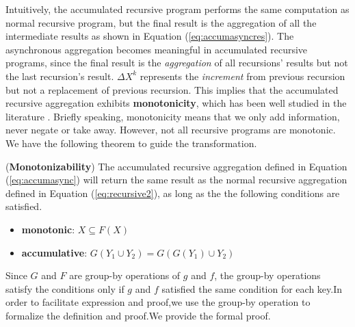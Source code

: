 {\color{green}
Intuitively, the accumulated recursive program performs the same computation as normal recursive program, but the final result is the aggregation of all the intermediate results as shown in Equation (\ref{eq:accumasyncres}). The asynchronous aggregation becomes meaningful in accumulated recursive programs, since the final result is the \emph{aggregation} of all recursions' results but not the last recursion's result. $\Delta X^{k}$ represents the \emph{increment} from previous recursion but not a replacement of previous recursion. This implies that the accumulated recursive aggregation exhibits \textbf{monotonicity}, which has been well studied in the literature \cite{Hellerstein:2010:DIE:1860702.1860704,calm,Lam:2013:SDE:2510649.2511289,Wang:2015:AFR:2824032.2824052}. Briefly speaking, monotonicity means that we only add information, never negate or take away. However, not all recursive programs are monotonic. We have the following theorem to guide the transformation.
}
\begin{definition}
	\label{th:monotone}
	(\textbf{Monotonizability}) The accumulated recursive aggregation defined in Equation (\ref{eq:accumasync}) will return the same result as the normal recursive aggregation defined in Equation (\ref{eq:recursive2}), as long as the the following conditions are satisfied.
	\begin{itemize}
		\item \textbf{monotonic}: $X\subseteq F(X)$
		\item \textbf{accumulative}: $G(Y_1\cup Y_2)=G(G(Y_1)\cup Y_2)$
	\end{itemize}
	
\end{definition}
{\color{green}
Since $G$ and $F$ are group-by operations of $g$ and $f$, the group-by operations satisfy the conditions only if $g$ and $f$ satisfied the same condition for each key.In order to facilitate expression and proof,we use the group-by operation to formalize the definition and proof.We provide the formal proof.
}
